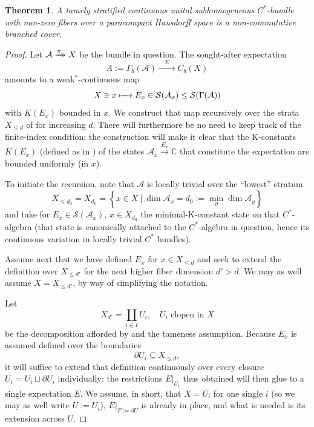 \documentclass[11pt,leqno]{article}
\theoremstyle{plain}
\newtheorem{theorem}[lemma]{Theorem}
\theoremstyle{plain}
\theoremstyle{plain}
\numberwithin{equation}{section}
\theoremstyle{nonumberplain}
\newtheorem{proof}{Proof}
\newcommand\bC{{\mathbb C}}
\newcommand\cA{{\mathcal A}}
\newcommand\cS{{\mathcal S}}
\newcommand\1{{\bf 1}}
\newcommand{\xrightarrowdbl}[2][]{%
  \xrightarrow[#1]{#2}\mathrel{\mkern-14mu}\rightarrow
}
\begin{document}
\begin{theorem}\label{th:tame.strat}
  A tamely stratified continuous unital subhomogeneous $C^*$-bundle with non-zero fibers over a paracompact Hausdorff space is a non-commutative branched cover. 
\end{theorem}
\begin{proof}
  Let $\cA\xrightarrowdbl{\pi}X$ be the bundle in question. The sought-after expectation
  \begin{equation*}
    A:=\Gamma_b(\cA)
    \xrightarrow{\quad E\quad}
    C_b(X)
  \end{equation*}
  amounts to a weak$^*$-continuous map
  \begin{equation*}
    X\ni x
    \xmapsto{\quad}
    E_x\in \cS(\cA_x)\le \cS(\Gamma(\cA))
  \end{equation*}
  with $K(E_x)$ bounded in $x$. We construct that map recursively over the strata $X_{\le d}$ of  for increasing $d$. There will furthermore be no need to keep track of the finite-index condition: the construction will make it clear that the K-constants $K(E_x)$ (defined as in ) of the states $\cA_x\xrightarrow{E_x}\bC$ that constitute the expectation are bounded uniformly (in $x$).
  
  To initiate the recursion, note \cite[Proposition 16.4 and Theorem 18.5]{gierz_bdls} that $\cA$ is locally trivial over the ``lowest'' stratum
  \begin{equation*}
    X_{\le d_0} = X_{d_0} = \left\{x\in X\ |\ \dim \cA_x=d_0:=\min_{y}\dim \cA_y\right\}
  \end{equation*}
  and take for $E_x\in \cS(\cA_x)$, $x\in X_{d_0}$ the minimal-K-constant state on that $C^*$-algebra (that state is canonically attached \cite[Lemma 3.2]{bg_cx-exp} to the $C^*$-algebra in question, hence its continuous variation in locally trivial $C^*$ bundles). 

  Assume next that we have defined $E_x$ for $x\in X_{\le d}$ and seek to extend the definition over $X_{\le d'}$ for the next higher fiber dimension $d'>d$. We may as well assume $X=X_{\le d'}$, by way of simplifying the notation.

  Let
  \begin{equation}\label{eq:xd.clopen.part}
    X_{d'} = \coprod_{i\in I}U_i
    ,\quad
    U_i\text{ clopen in }X
  \end{equation}
  be the decomposition afforded by  and the tameness assumption. Because $E_x$ is assumed defined over the boundaries
  \begin{equation*}
    \partial U_i\subseteq X_{\le d},
  \end{equation*}
  it will suffice to extend that definition continuously over every closure $\overline{U_i}=U_i\sqcup \partial U_i$ individually: the restrictions $E|_{\overline{U_i}}$ thus obtained will then glue to a single expectation $E$. We assume, in short, that $X=\overline{U_i}$ for one single $i$ (so we may as well write $U:=U_i$), $E|_{F:=\partial U}$ is already in place, and what is needed is its extension across $U$.


\end{proof}
\end{document}
